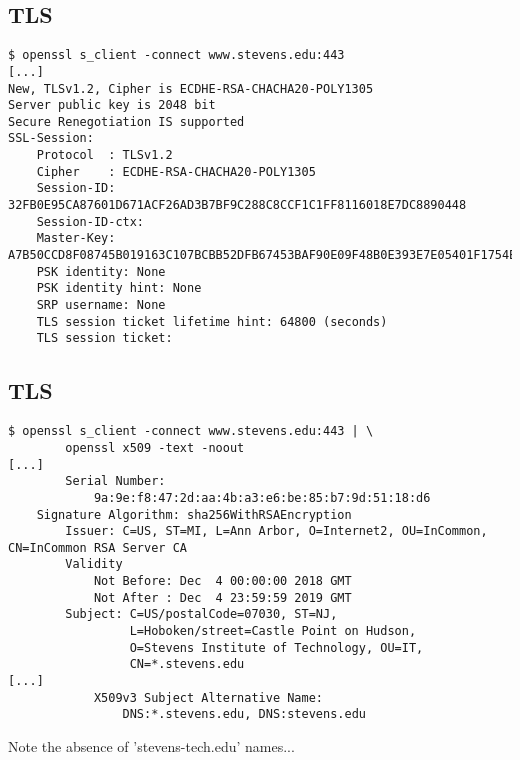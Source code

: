 \documentclass[xga]{xdvislides}
\begin{document}
\subsection{TLS}
\begin{verbatim}
$ openssl s_client -connect www.stevens.edu:443
[...]
New, TLSv1.2, Cipher is ECDHE-RSA-CHACHA20-POLY1305
Server public key is 2048 bit
Secure Renegotiation IS supported
SSL-Session:
    Protocol  : TLSv1.2
    Cipher    : ECDHE-RSA-CHACHA20-POLY1305
    Session-ID: 32FB0E95CA87601D671ACF26AD3B7BF9C288C8CCF1C1FF8116018E7DC8890448
    Session-ID-ctx: 
    Master-Key: A7B50CCD8F08745B019163C107BCBB52DFB67453BAF90E09F48B0E393E7E05401F1754E67E0C6005F656A55B493444CA
    PSK identity: None
    PSK identity hint: None
    SRP username: None
    TLS session ticket lifetime hint: 64800 (seconds)
    TLS session ticket:
\end{verbatim}

\subsection{TLS}
\smallish
\begin{verbatim}
$ openssl s_client -connect www.stevens.edu:443 | \
        openssl x509 -text -noout
[...]
        Serial Number:
            9a:9e:f8:47:2d:aa:4b:a3:e6:be:85:b7:9d:51:18:d6
    Signature Algorithm: sha256WithRSAEncryption
        Issuer: C=US, ST=MI, L=Ann Arbor, O=Internet2, OU=InCommon, CN=InCommon RSA Server CA
        Validity
            Not Before: Dec  4 00:00:00 2018 GMT
            Not After : Dec  4 23:59:59 2019 GMT
        Subject: C=US/postalCode=07030, ST=NJ,
                 L=Hoboken/street=Castle Point on Hudson,
                 O=Stevens Institute of Technology, OU=IT,
                 CN=*.stevens.edu
[...]
            X509v3 Subject Alternative Name: 
                DNS:*.stevens.edu, DNS:stevens.edu
\end{verbatim}
\Normalsize
Note the absence of 'stevens-tech.edu' names...

% 
% 
% 
% 
% 
 
\end{document}
